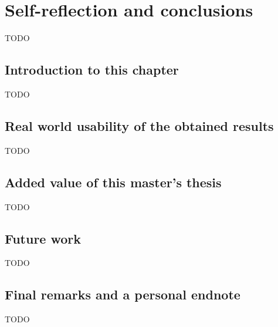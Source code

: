 



\chapter{Self-reflection and conclusions}
\label{ch:discussion}
TODO

\section{Introduction to this chapter}
\label{sec:discussion_introduction}

TODO

\section{Real world usability of the obtained results}
\label{sec:discussion_added_value}

TODO

\section{Added value of this master's thesis}
\label{sec:discussion_added_value}

TODO

\section{Future work}
\label{sec:discussion_future_work}

TODO

\section{Final remarks and a personal endnote}
\label{sec:discussion_final_remarks}

TODO
